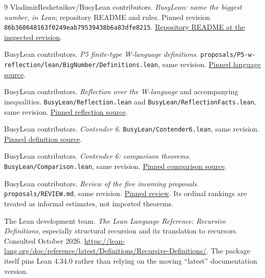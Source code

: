 \documentclass[11pt,letterpaper]{article}
\theoremstyle{definition}
\newcommand{\code}[1]{\nolinkurl{#1}}
\newcommand{\sourcecommit}{\texttt{86b360648163f0249eab79539438b6a83dfe8215}}
\begin{document}
\begin{thebibliography}{9}
\small
{}
VladimirReshetnikov/BusyLean contributors.
\emph{BusyLean: name the biggest number, in Lean}; repository README and rules.
Pinned revision \sourcecommit.
\href{https://github.com/VladimirReshetnikov/BusyLean/blob/86b360648163f0249eab79539438b6a83dfe8215/README.md}{Repository README at the inspected revision}.

BusyLean contributors.
\emph{P5 finite-type W-language definitions}.
\code{proposals/P5-w-reflection/lean/BigNumber/Definitions.lean}, same revision.
\href{https://github.com/VladimirReshetnikov/BusyLean/blob/86b360648163f0249eab79539438b6a83dfe8215/proposals/P5-w-reflection/lean/BigNumber/Definitions.lean}{Pinned language source}.

BusyLean contributors.
\emph{Reflection over the W-language} and accompanying inequalities.
\code{BusyLean/Reflection.lean} and \code{BusyLean/ReflectionFacts.lean}, same revision.
\href{https://github.com/VladimirReshetnikov/BusyLean/blob/86b360648163f0249eab79539438b6a83dfe8215/BusyLean/Reflection.lean}{Pinned reflection source}.

BusyLean contributors.
\emph{Contender 6}.
\code{BusyLean/Contender6.lean}, same revision.
\href{https://github.com/VladimirReshetnikov/BusyLean/blob/86b360648163f0249eab79539438b6a83dfe8215/BusyLean/Contender6.lean}{Pinned definition source}.

BusyLean contributors.
\emph{Contender 6: comparison theorems}.
\code{BusyLean/Comparison.lean}, same revision.
\href{https://github.com/VladimirReshetnikov/BusyLean/blob/86b360648163f0249eab79539438b6a83dfe8215/BusyLean/Comparison.lean}{Pinned comparison source}.

BusyLean contributors.
\emph{Review of the five incoming proposals}.
\code{proposals/REVIEW.md}, same revision.
\href{https://github.com/VladimirReshetnikov/BusyLean/blob/86b360648163f0249eab79539438b6a83dfe8215/proposals/REVIEW.md}{Pinned review}.
Its ordinal rankings are treated as informal estimates, not imported theorems.

The Lean development team.
\emph{The Lean Language Reference: Recursive Definitions}, especially
structural recursion and its translation to recursors. Consulted October 2026.
\url{https://lean-lang.org/doc/reference/latest/Definitions/Recursive-Definitions/}.
The package itself pins Lean 4.34.0 rather than relying on the moving
``latest'' documentation version.
\end{thebibliography}
\end{document}
